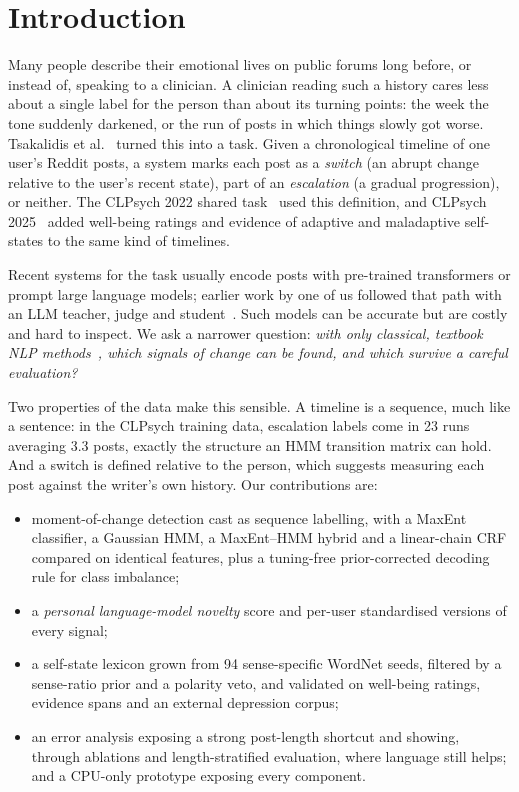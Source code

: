 \documentclass[conference]{IEEEtran}
\begin{document}
\section{Introduction}

Many people describe their emotional lives on public forums long before, or instead of, speaking to a clinician. A clinician reading such a history cares less about a single label for the person than about its turning points: the week the tone suddenly darkened, or the run of posts in which things slowly got worse. Tsakalidis et al.~\cite{tsakalidis2022identifying} turned this into a task. Given a chronological timeline of one user's Reddit posts, a system marks each post as a \emph{switch} (an abrupt change relative to the user's recent state), part of an \emph{escalation} (a gradual progression), or neither. The CLPsych 2022 shared task~\cite{tsakalidis2022overview} used this definition, and CLPsych 2025~\cite{tseriotou2025overview} added well-being ratings and evidence of adaptive and maladaptive self-states to the same kind of timelines.

Recent systems for the task usually encode posts with pre-trained transformers or prompt large language models; earlier work by one of us followed that path with an LLM teacher, judge and student~\cite{kumar2026triage}. Such models can be accurate but are costly and hard to inspect. We ask a narrower question: \emph{with only classical, textbook NLP methods~\cite{jurafsky2024speech}, which signals of change can be found, and which survive a careful evaluation?}

Two properties of the data make this sensible. A timeline is a sequence, much like a sentence: in the CLPsych training data, escalation labels come in 23 runs averaging 3.3 posts, exactly the structure an HMM transition matrix can hold. And a switch is defined relative to the person, which suggests measuring each post against the writer's own history. Our contributions are:
\begin{itemize}
\item moment-of-change detection cast as sequence labelling, with a MaxEnt classifier, a Gaussian HMM, a MaxEnt--HMM hybrid and a linear-chain CRF compared on identical features, plus a tuning-free prior-corrected decoding rule for class imbalance;
\item a \emph{personal language-model novelty} score and per-user standardised versions of every signal;
\item a self-state lexicon grown from 94 sense-specific WordNet seeds, filtered by a sense-ratio prior and a polarity veto, and validated on well-being ratings, evidence spans and an external depression corpus;
\item an error analysis exposing a strong post-length shortcut and showing, through ablations and length-stratified evaluation, where language still helps; and a CPU-only prototype exposing every component.
\end{itemize}
\end{document}
